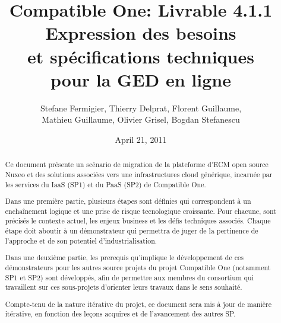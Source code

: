 \documentclass[a4paper,11pt]{article}
\title{Compatible One: Livrable 4.1.1\\
Expression des besoins\\
et spécifications techniques\\
pour la GED en ligne}
\date{April 21, 2011}
\author{Stefane Fermigier, Thierry Delprat, Florent Guillaume,\\
Mathieu Guillaume, Olivier Grisel, Bogdan Stefanescu}
\begin{document}
\maketitle
\tableofcontents

\pagebreak

\begin{abstract}
  Ce document présente un scénario de migration de la plateforme d'ECM open source Nuxeo et des solutions associées vers une infrastructures cloud générique, incarnée par les services du IaaS (SP1) et du PaaS (SP2) de Compatible One.
  
  Dans une première partie, plusieurs étapes sont définies qui correspondent à un enchaînement logique et une prise de risque tecnologique croissante. Pour chacune, sont précisés le contexte actuel, les enjeux business et les défis techniques associés. Chaque étape doit aboutir à un démonstrateur qui permettra de juger de la pertinence de l'approche et de son potentiel d'industrialisation.
  
  Dans une deuxième partie, les prerequis qu'implique le développement de ces démonstrateurs pour les autres source projets du projet Compatible One (notamment SP1 et SP2) sont développés, afin de permettre aux membres du consortium qui travaillent sur ces sous-projets d'orienter leurs travaux dans le sens souhaité.

  Compte-tenu de la nature itérative du projet, ce document sera mis à jour de manière itérative, en fonction des leçons acquires et de l'avancement des autres SP.
\end{abstract}




\end{document}
